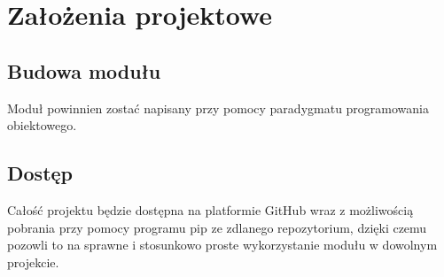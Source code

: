 \chapter{Założenia projektowe}

\section{Budowa modułu}
Moduł powinnien zostać napisany przy pomocy paradygmatu programowania
obiektowego. 

\section{Dostęp}
Całość projektu będzie dostępna na platformie GitHub wraz z możliwością 
pobrania przy pomocy programu pip ze zdlanego repozytorium, dzięki czemu 
pozowli to na sprawne i stosunkowo proste wykorzystanie modułu w dowolnym 
projekcie. 